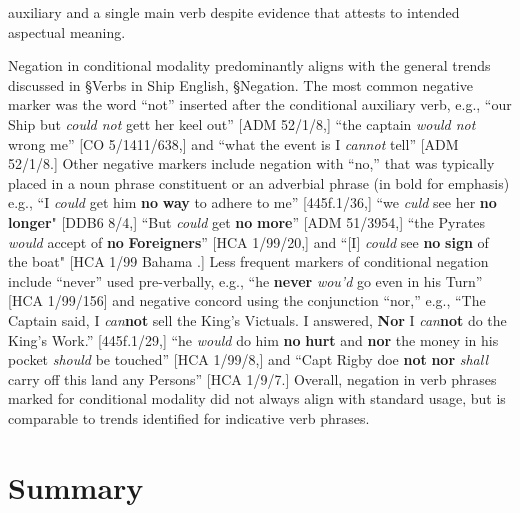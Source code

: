auxiliary and a single main verb despite evidence that attests to intended aspectual meaning. 

  Negation in conditional modality predominantly aligns with the general trends discussed in §Verbs in Ship English, §Negation. The most common negative marker was the word “not” inserted after the conditional auxiliary verb, e.g., “our Ship but \textit{could not} gett her keel out” [ADM 52/1/8,] “the captain \textit{would not} wrong me” [CO 5/1411/638,] and “what the event is I \textit{cannot} tell” [ADM 52/1/8.] Other negative markers include negation with “no,” that was typically placed in a noun phrase constituent or an adverbial phrase (in bold for emphasis) e.g., “I \textit{could} get him \textbf{no} \textbf{way} to adhere to me” [445f.1/36,] “we \textit{culd} see her \textbf{no} \textbf{longer}" [DDB6 8/4,] “But \textit{could} get \textbf{no} \textbf{more}” [ADM 51/3954,] “the Pyrates \textit{would} accept of \textbf{no} \textbf{Foreigners}” [HCA 1/99/20,] and “[I] \textit{could} see \textbf{no} \textbf{sign} of the boat" [HCA 1/99 Bahama \citealt{Islands1722}.] Less frequent markers of conditional negation include “never” used pre-verbally, e.g., “he \textbf{never} \textit{wou’d} go even in his Turn” [HCA 1/99/156] and negative concord using the conjunction “nor,” e.g., “The Captain said, I \textit{can}\textbf{not} sell the King’s Victuals. I answered, \textbf{Nor} I \textit{can}\textbf{not} do the King’s Work.” [445f.1/29,] “he \textit{would} do him \textbf{no} \textbf{hurt} and \textbf{nor} the money in his pocket \textit{should} be touched” [HCA 1/99/8,] and “Capt Rigby doe \textbf{not} \textbf{nor} \textit{shall} carry off this land any Persons” [HCA 1/9/7.] Overall, negation in verb phrases marked for conditional modality did not always align with standard usage, but is comparable to trends identified for indicative verb phrases. 

\section{{Summary}}%


